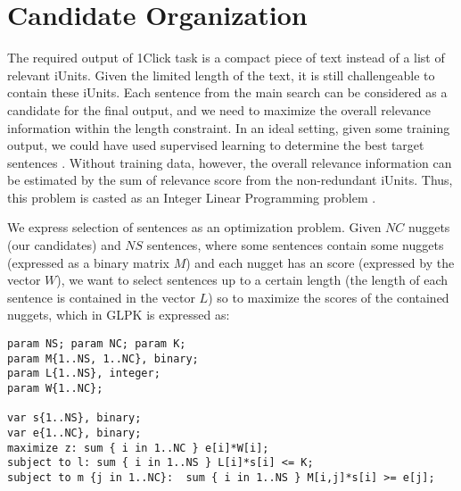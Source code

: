 \section{Candidate Organization}

The required output of 1Click task is a compact piece of text instead
of a list of relevant iUnits.  Given the limited length of the text,
it is still challengeable to contain these iUnits.  Each sentence from
the main search can be considered as a candidate for the final output,
and we need to maximize the overall relevance information within the
length constraint.  In an ideal setting, given some training output,
we could have used supervised learning to determine the best target
sentences \cite{Gondek_al:12}. Without training data, however, the
overall relevance information can be estimated by the sum of relevance
score from the non-redundant iUnits.  Thus, this problem is casted as
an Integer Linear Programming problem \cite{McDonald_ECIR07}.

We express selection of sentences as an optimization problem. Given
$NC$ nuggets (our candidates) and $NS$ sentences, where some sentences
contain some nuggets (expressed as a binary matrix $M$) and each
nugget has an score (expressed by the vector $W$), we want to select
sentences up to a certain length (the length of each sentence is
contained in the vector $L$) so to maximize the scores of the
contained nuggets, which in GLPK \cite{Makhorin/00/GLPK} is expressed as:

\begin{verbatim}
param NS; param NC; param K;  
param M{1..NS, 1..NC}, binary; 
param L{1..NS}, integer; 
param W{1..NC}; 

var s{1..NS}, binary; 
var e{1..NC}, binary; 
maximize z: sum { i in 1..NC } e[i]*W[i]; 
subject to l: sum { i in 1..NS } L[i]*s[i] <= K; 
subject to m {j in 1..NC}:  sum { i in 1..NS } M[i,j]*s[i] >= e[j];
\end{verbatim}


